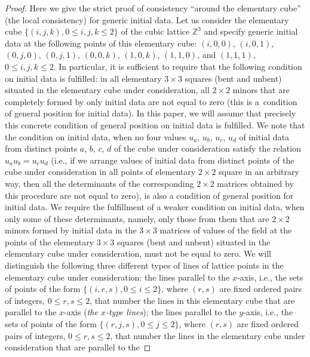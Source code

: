 \begin{proof}
 Here we give the strict proof of consistency
``around the elementary cube'' (the local consistency) for generic initial data.
Let us consider the elementary cube $\{(i, j, k), 0
\leq i, j, k \leq 2 \}$ of the cubic lattice $\mathbb{Z}^3$ and
specify generic initial data at the following points of this
elementary cube: $(i, 0, 0)$, $(i, 0, 1)$, $(0, j, 0)$, $(0, j, 1)$,
$(0, 0, k)$, $(1, 0, k)$, $(1, 1, 0)$, and $(1, 1, 1)$, $0 \leq i,
j, k \leq 2$. In particular, it is suf\/f\/icient to require that the
following condition on initial data is fulf\/illed: in all elementary
$3 \times 3$ squares (bent and unbent) situated in the elementary
cube under consideration, all $2 \times 2$ minors that are
completely formed by only initial data are not equal to zero (this
is a~condition of general position for initial data). In this paper,
we will assume that precisely this concrete condition of general
position on initial data is fulf\/illed. We note that the condition on
initial data, when no four values $u_a$, $u_b$, $u_c$, $u_d$ of initial
data from distinct points $a$, $b$, $c$, $d$ of the cube under
consideration satisfy the relation $u_a u_b = u_c u_d$ (i.e., if we
arrange values of initial data from distinct points of the cube
under consideration in all points of elementary $2 \times 2$ square
in an arbitrary way, then all the determinants of the corresponding
$2 \times 2$ matrices obtained by this procedure are not equal to
zero), is also a condition of general position for initial data. We
require the fulf\/illment of a weaker condition on initial data, when
only some of these determinants, namely, only those from them that
are $2 \times 2$ minors formed by initial data in the $3 \times 3$
matrices of values of the f\/ield at the points of the elementary $3
\times 3$ squares (bent and unbent) situated in the elementary cube
under consideration, must not be equal to zero. We will distinguish
the following three dif\/ferent types of lines of lattice points in
the elementary cube under consideration: the lines parallel to the
$x$-axis, i.e., the sets of points of the form $\{(i, r, s), 0 \leq
i \leq 2\}$, where $(r, s)$ are f\/ixed ordered pairs of integers, $0
\leq r, s \leq 2$, that number the lines in this elementary cube
that are parallel to the $x$-axis ({\it the $x$-type lines}); the
lines parallel to the $y$-axis, i.e., the sets of points of the form
$\{(r, j, s), 0 \leq j \leq 2\}$, where $(r, s)$ are f\/ixed ordered
pairs of integers, $0 \leq r, s \leq 2$, that number the lines in
the elementary cube under consideration that are parallel to the

\end{proof}

